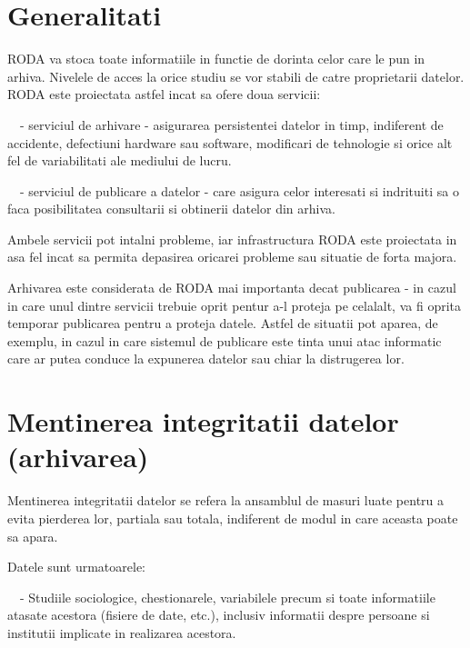 \clearpage
\section{Generalitati}


\bigskip

{\sffamily\color{black}
RODA va stoca toate informatiile in functie de dorinta celor care le pun in arhiva. Nivelele de acces la orice studiu se
vor stabili de catre proprietarii datelor. RODA este proiectata astfel incat sa ofere doua servicii:}

{\sffamily\color{black}
\ \ {}- serviciul de arhivare - asigurarea persistentei datelor in timp, indiferent de accidente, defectiuni hardware
sau software, modificari de tehnologie si orice alt fel de variabilitati ale mediului de lucru.}

{\sffamily\color{black}
\ \ {}- serviciul de publicare a datelor - care asigura celor interesati si indrituiti sa o faca posibilitatea
consultarii si obtinerii datelor din arhiva. }


\bigskip

{\sffamily\color{black}
Ambele servicii pot intalni probleme, iar infrastructura RODA este proiectata in asa fel incat sa permita depasirea
oricarei probleme sau situatie de forta majora. }


\bigskip

{\sffamily\color{black}
Arhivarea este considerata de RODA mai importanta decat publicarea - in cazul in care unul dintre servicii trebuie oprit
pentur a-l proteja pe celalalt, va fi oprita temporar publicarea pentru a proteja datele. Astfel de situatii pot
aparea, de exemplu, in cazul in care sistemul de publicare este tinta unui atac informatic care ar putea conduce la
expunerea datelor sau chiar la distrugerea lor. }


\bigskip

\section{Mentinerea integritatii datelor (arhivarea)}

\bigskip

{\sffamily\color{black}
Mentinerea integritatii datelor se refera la ansamblul de masuri luate pentru a evita pierderea lor, partiala sau
totala, indiferent de modul in care aceasta poate sa apara. }

{\sffamily\color{black}
Datele sunt urmatoarele:}

{\sffamily\color{black}
\ \ {}- Studiile sociologice, chestionarele, variabilele precum si toate informatiile atasate acestora (fisiere de date,
etc.), inclusiv informatii despre persoane si institutii implicate in realizarea acestora.}

